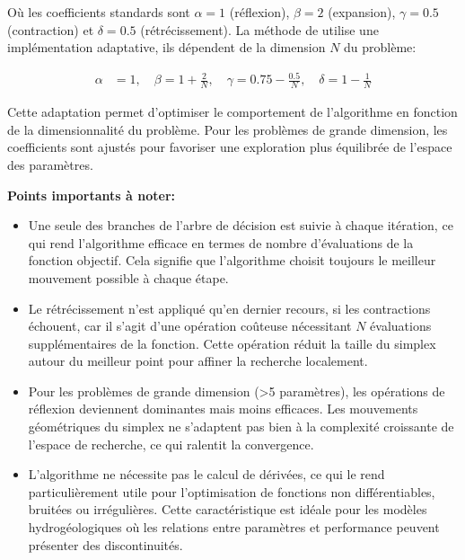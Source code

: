 Où les coefficients standards sont $\alpha = 1$ (réflexion), $\beta = 2$ (expansion), $\gamma = 0.5$ (contraction) et $\delta = 0.5$ (rétrécissement). La méthode  de  utilise une implémentation adaptative, ils dépendent de la dimension $N$ du problème:

\begin{align}
\alpha &= 1, \quad \beta = 1 + \frac{2}{N}, \quad \gamma = 0.75 - \frac{0.5}{N}, \quad \delta = 1 - \frac{1}{N}
\end{align}

Cette adaptation permet d'optimiser le comportement de l'algorithme en fonction de la dimensionnalité du problème. Pour les problèmes de grande dimension, les coefficients sont ajustés pour favoriser une exploration plus équilibrée de l'espace des paramètres.

\vspace{1em}

\begin{InfoBox}
    \noindent\textbf{Points importants à noter:}
        \begin{itemize}[leftmargin=1cm]
            \item Une seule des branches de l'arbre de décision est suivie à chaque itération, ce qui rend l'algorithme efficace en termes de nombre d'évaluations de la fonction objectif. Cela signifie que l'algorithme choisit toujours le meilleur mouvement possible à chaque étape.
            
            \item Le rétrécissement n'est appliqué qu'en dernier recours, si les contractions échouent, car il s'agit d'une opération coûteuse nécessitant $N$ évaluations supplémentaires de la fonction. Cette opération réduit la taille du simplex autour du meilleur point pour affiner la recherche localement.
            
            \item Pour les problèmes de grande dimension (>5 paramètres), les opérations de réflexion deviennent dominantes mais moins efficaces. Les mouvements géométriques du simplex ne s'adaptent pas bien à la complexité croissante de l'espace de recherche, ce qui ralentit la convergence.
            
            \item L'algorithme ne nécessite pas le calcul de dérivées, ce qui le rend particulièrement utile pour l'optimisation de fonctions non différentiables, bruitées ou irrégulières. Cette caractéristique est idéale pour les modèles hydrogéologiques où les relations entre paramètres et performance peuvent présenter des discontinuités.
        \end{itemize}
\end{InfoBox}

